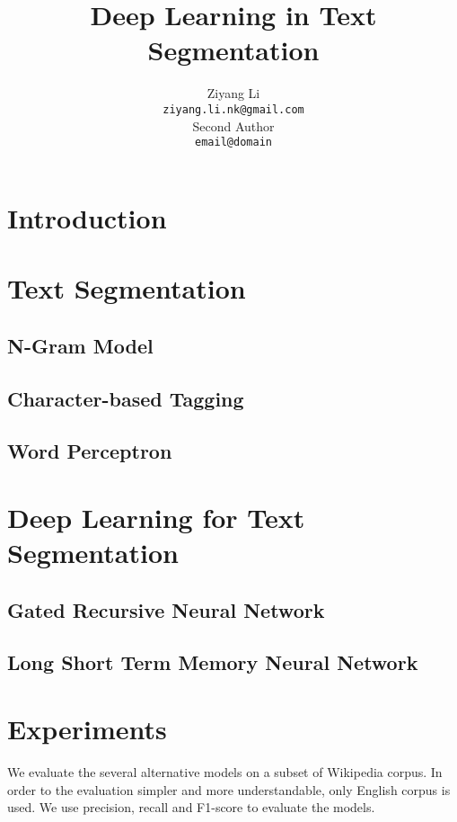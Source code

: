 \documentclass[11pt]{article}
\title{Deep Learning in Text Segmentation}
\author{Ziyang Li \\
  {\tt ziyang.li.nk@gmail.com} \\\And
  Second Author \\
  {\tt email@domain} \\}
\date{}
\begin{document}
\maketitle
\begin{abstract}
\end{abstract}

\section{Introduction}

\section{Text Segmentation}

\subsection{N-Gram Model}

\subsection{Character-based Tagging}

\subsection{Word Perceptron}

\section{Deep Learning for Text Segmentation}

\subsection{Gated Recursive Neural Network}

\subsection{Long Short Term Memory Neural Network}

\section{Experiments}
We evaluate the several alternative models on a subset of Wikipedia corpus. In order to the evaluation simpler and more understandable, only English corpus is used. We use precision, recall and F1-score to evaluate the models.
\end{document}
